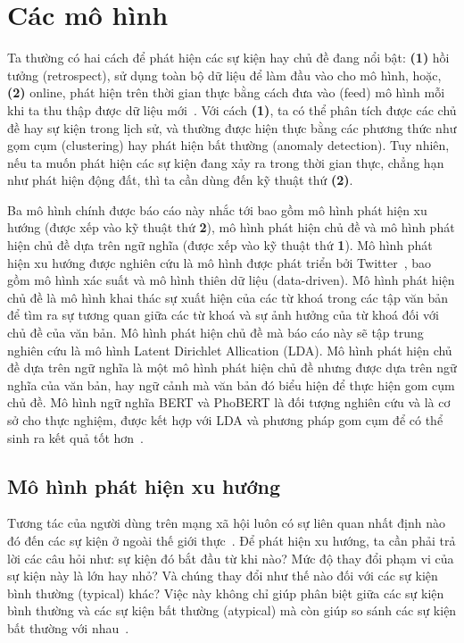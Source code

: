 \section{Các mô hình}
\label{sec:models}
Ta thường có hai cách để phát hiện các sự kiện hay chủ đề đang nổi bật:
\textbf{(1)} hồi tưởng (retrospect), sử dụng toàn bộ dữ liệu để làm đầu vào cho
mô hình, hoặc, \textbf{(2)} online, phát hiện trên thời gian thực bằng cách đưa
vào (feed) mô hình mỗi khi ta thu thập được dữ liệu
mới~\cite{lauOnlineTrendAnalysis2012}. Với cách \textbf{(1)}, ta có thể phân
tích được các chủ đề hay sự kiện trong lịch sử, và thường được hiện thực bằng
các phương thức như gọm cụm (clustering) hay phát hiện bất thường (anomaly
detection). Tuy nhiên, nếu ta muốn phát hiện các sự kiện đang xảy ra trong thời
gian thực, chẳng hạn như phát hiện động đất, thì ta cần dùng đến kỹ thuật thứ
\textbf{(2)}.

Ba mô hình chính được báo cáo này nhắc tới bao gồm mô hình phát hiện xu hướng
(được xếp vào kỹ thuật thứ \textbf{2}), mô hình phát hiện chủ đề và mô hình
phát hiện chủ đề dựa trên ngữ nghĩa (được xếp vào kỹ thuật thứ \textbf{1}).  Mô
hình phát hiện xu hướng được nghiên cứu là mô hình được phát triển bởi
Twitter~\cite{hendricksonTrendDetectionSocial2015}, bao gồm mô hình xác suất và
mô hình thiên dữ liệu (data-driven). Mô hình phát hiện chủ đề là mô hình khai
thác sự xuất hiện của các từ khoá trong các tập văn bản để tìm ra sự tương quan
giữa các từ khoá và sự ảnh hưởng của từ khoá đối với chủ đề của văn bản. Mô
hình phát hiện chủ đề mà báo cáo này sẽ tập trung nghiên cứu là mô hình Latent
Dirichlet Allication (LDA). Mô hình phát hiện chủ đề dựa trên ngữ nghĩa là một
mô hình phát hiện chủ đề nhưng được dựa trên ngữ nghĩa của văn bản, hay ngữ
cảnh mà văn bản đó biểu hiện để thực hiện gom cụm chủ đề. Mô hình ngữ nghĩa
BERT và PhoBERT là đối tượng nghiên cứu và là cơ sở cho thực nghiệm, được kết
hợp với LDA và phương pháp gom cụm để có thể sinh ra kết quả tốt
hơn~\cite{lamGomCumVan2021}.



\subsection{Mô hình phát hiện xu hướng}
Tương tác của người dùng trên mạng xã hội luôn có sự liên quan nhất định nào đó
đến các sự kiện ở ngoài thế giới
thực~\cite{hendricksonTrendDetectionSocial2015}. Để phát hiện xu hướng, ta cần
phải trả lời các câu hỏi như: sự kiện đó bắt đầu từ khi nào? Mức độ thay đổi
phạm vi của sự kiện này là lớn hay nhỏ? Và chúng thay đổi như thế nào đối với
các sự kiện bình thường (typical) khác? Việc này không chỉ giúp phân biệt giữa
các sự kiện bình thường và các sự kiện bất thường (atypical) mà còn giúp so
sánh các sự kiện bất thường với
nhau~\cite{hendricksonTrendDetectionSocial2015}.


